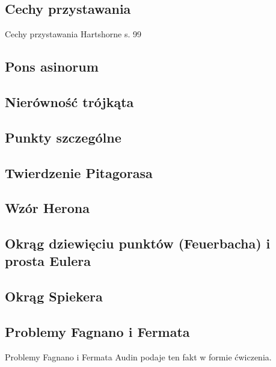

\subsection{Cechy przystawania}
Cechy przystawania
\loremipsum
Hartshorne s. 99

\subsection{Pons asinorum}


\subsection{Nierówność trójkąta}


\subsection{Punkty szczególne}


\subsection{Twierdzenie Pitagorasa}


\subsection{Wzór Herona}


\subsection{Okrąg dziewięciu punktów (Feuerbacha) i prosta Eulera}


\subsection{Okrąg Spiekera}


\subsection{Problemy Fagnano i Fermata}
Problemy Fagnano i Fermata %
Audin \cite[s. 101]{audin_2003} podaje ten fakt w formie ćwiczenia.

